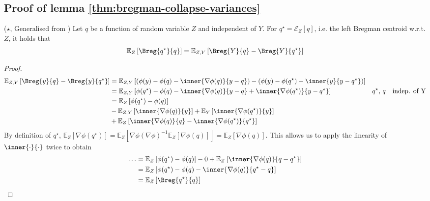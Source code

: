 \documentclass[
	twoside=false, %
]{kaobook}
\begin{document}
\subsection{Proof of lemma \ref{thm:bregman-collapse-variances}}
\label{proof:bregman-collapse-variances}
\begin{lemma}  ($\star$, Generalised from \cite{wood_UnifiedTheoryDiversity_2023})
Let $q$ be a function of random variable $Z$ and independent of $Y$. For $q^\star = \mathcal{E}_{Z}\left[ q \right]$, i.e. the left Bregman centroid w.r.t. $Z$, it holds that
$$
\mathbb{E}_{Z}\left[ \Breg{q^\star}{q} \right] 
 = \mathbb{E}_{Z,Y}\left[ \Breg{Y}{q} - \Breg{Y}{q^\star} \right] 
$$
\end{lemma}
\begin{proof}
\begin{align*}
    \mathbb{E}_{Z,Y}\left[ \Breg{y}{q} - \Breg{y}{q^\star} \right]  
    &= \mathbb{E}_{Z,Y}\left[ (\phi(y) - \phi(q) - \inner{\nabla \phi(q)}{y-q}) - (\phi(y) - \phi(q^\star) - \inner{y}{y - q^\star}) \right]  \\
    &= \mathbb{E}_{Z,Y}\left[ \phi(q^\star) - \phi(q) - \inner{\nabla \phi(q)}{y-q} + \inner{\nabla \phi(q^\star)}{y-q^\star}\right]  & \text{$q^\star$, $q$ ~~indep. of Y} \\ 
    &= \mathbb{E}_{Z}\left[  \phi(q^\star) - \phi(q) \right]  \\
    &- \mathbb{E}_{Z,Y}\left[ \inner{\nabla \phi(q)}{y}\right]  + \mathbb{E}_{Y}\left[ \inner{\nabla \phi(q^\star)}{y} \right] \\
    &+ \mathbb{E}_{Z}\left[ \inner{\nabla \phi(q)}{q} - \inner{\nabla \phi(q^\star)}{q^\star} \right] 
\end{align*}
By definition of $q^\star$, $\mathbb{E}_{Z}\left[ \nabla \phi(q^\star) \right] = \mathbb{E}_{Z}\left[ \nabla \phi (\nabla \phi)^{-1} \mathbb{E}_{Z}\left[ \nabla \phi(q) \right] \right] = \mathbb{E}_{Z}\left[ \nabla \phi(q) \right]$. This allows us to apply the linearity of $\inner{\cdot}{\cdot}$ twice to obtain
\begin{align*}
    \dots &= \mathbb{E}_{Z}\left[ \phi(q^\star) - \phi(q) \right]  - 0 + \mathbb{E}_{Z}\left[ \inner{\nabla \phi(q)}{q-q^\star} \right]  \\
    &= \mathbb{E}_{Z}\left[ \phi(q^\star) - \phi(q)  - \inner{\nabla \phi(q)}{q^\star - q}\right]  \\
    &= \mathbb{E}_{Z}\left[ \Breg{q^\star}{q} \right] 
\end{align*}
\end{proof}
\end{document}
